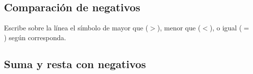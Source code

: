 \documentclass[12pt,addpoints,answers]{evalua}
\begin{document}
\begin{questions}
\begin{multicols}{2}
\begin{parts}
            \end{parts}
      \end{multicols}

      
	\subsection{Comparación de negativos}

      \question[6] Escribe sobre la línea el símbolo de mayor que ($>$), menor que ($<$), o igual ($=$) según corresponda.

      \begin{multicols}{2}
      \end{multicols}

      \newpage
	\subsection{Suma y resta con negativos}


\end{questions}
\end{document}
